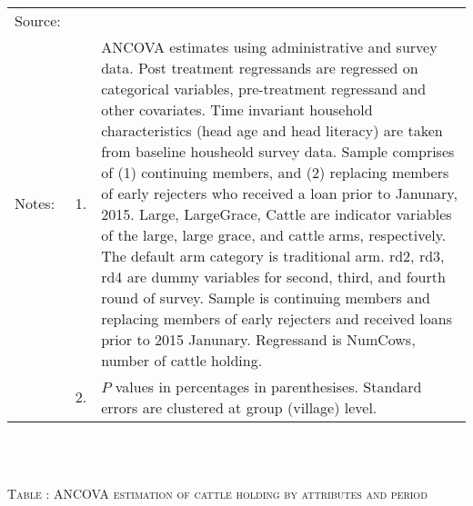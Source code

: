 \begin{minipage}[t]{14cm}
\\
\renewcommand{\arraystretch}{.8}
\setlength{\tabcolsep}{1pt} \begin{tabular}{>{\hfill\scriptsize}p{1cm}<{}>{\hfill\scriptsize}p{.25cm}<{}>{\scriptsize}p{12cm}<{\hfill}} 
Source:& \multicolumn{2}{l}{\scriptsize Estimated with GUK administrative and survey data.}\\
Notes: & 1. & ANCOVA estimates using administrative and survey data. Post treatment regressands are regressed on categorical variables, pre-treatment regressand and other covariates. Time invariant household characteristics (head age and head literacy) are taken from baseline housheold survey data. Sample comprises of (1) continuing members, and (2) replacing members of early rejecters who received a loan prior to Janunary, 2015.  \textsf{Large}, \textsf{LargeGrace}, \textsf{Cattle} are indicator variables of the \textsf{large}, \textsf{large grace}, and \textsf{cattle} arms, respectively. The default arm category is \textsf{traditional} arm. \textsf{rd2, rd3, rd4} are dummy variables for second, third, and fourth round of survey. Sample is continuing members and replacing members of early rejecters and received loans prior to 2015 Janunary. Regressand is \textsf{NumCows}, number of cattle holding. \\
& 2. & $P$ values in percentages in parenthesises. Standard errors are clustered at group (village) level. %
 \end{tabular}
\end{minipage} \\\\\hspace{-1cm}\begin{minipage}[t]{14cm} \hfil\textsc{\normalsize Table \thetable: ANCOVA estimation of cattle holding by attributes and period\label{tab ANCOVA cow time varying attributes}}\\ \setlength{\tabcolsep}{1pt}
  \setlength{\baselineskip}{8pt}
  \renewcommand{\arraystretch}{.55}
  \hfil{}
\end{minipage}
